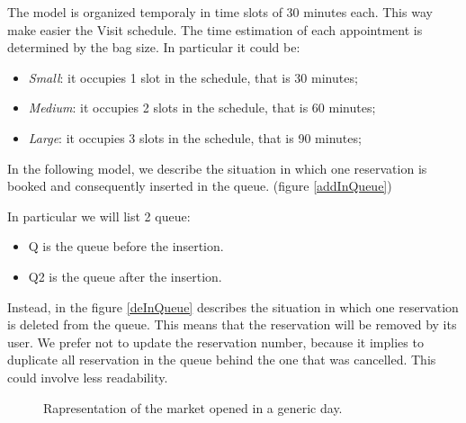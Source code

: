 The model is organized temporaly in time slots of 30 minutes each. This way make easier the Visit schedule. The time estimation of each appointment is determined by the bag size. In particular it could be:
\begin{itemize}
\item \textit{Small}: it occupies 1 slot in the schedule, that is 30 minutes;
\item \textit{Medium}: it occupies 2 slots in the schedule, that is 60 minutes;
\item \textit{Large}: it occupies 3 slots in the schedule, that is 90 minutes;
\end{itemize}


In the following model, we describe the situation in which one reservation is booked and consequently inserted in the queue. (figure \ref{addInQueue})

In particular we will list 2 queue:
\begin{itemize}
\item Q is the queue before the insertion.
\item Q2 is the queue after the insertion.
\end{itemize}



Instead, in the figure \ref{deInQueue} describes the situation in which one reservation is deleted from the queue.
This means that the reservation will be removed by its user.
We prefer not to update the reservation number, because it implies to duplicate all reservation in the queue behind the one that was cancelled. This could involve less readability.

\pagebreak



\pagebreak

\begin{figure}[H]
  \centering
    \caption{Rapresentation of the market opened in a generic day.}
      \label{marketOpened}

\end{figure}

